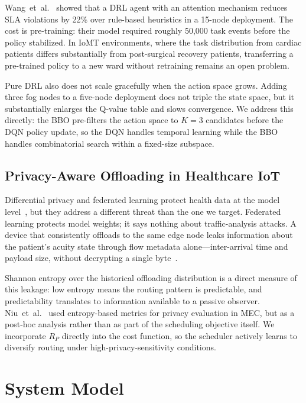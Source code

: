 \documentclass[journal]{IEEEtran}
\begin{document}
Wang~et~al.~\cite{wang2023attn} showed that a DRL agent with an
attention mechanism reduces SLA violations by 22\% over rule-based
heuristics in a 15-node deployment. The cost is pre-training: their
model required roughly 50{,}000 task events before the policy
stabilized. In IoMT environments, where the task distribution from
cardiac patients differs substantially from post-surgical recovery
patients, transferring a pre-trained policy to a new ward without
retraining remains an open problem.

Pure DRL also does not scale gracefully when the action space grows.
Adding three fog nodes to a five-node deployment does not triple the
state space, but it substantially enlarges the Q-value table and
slows convergence. We address this directly: the BBO pre-filters the
action space to $K = 3$ candidates before the DQN policy update,
so the DQN handles temporal learning while the BBO handles
combinatorial search within a fixed-size subspace.

\subsection{Privacy-Aware Offloading in Healthcare IoT}

Differential privacy and federated learning protect health data at the
model level~\cite{abadi2016dp}, but they address a different threat
than the one we target. Federated learning protects model weights; it
says nothing about traffic-analysis attacks. A device that consistently
offloads to the same edge node leaks information about the patient's
acuity state through flow metadata alone---inter-arrival time and
payload size, without decrypting a single byte~\cite{goldreich2001comp}.

Shannon entropy over the historical offloading distribution is a direct
measure of this leakage: low entropy means the routing pattern is
predictable, and predictability translates to information available to
a passive observer. Niu~et~al.~\cite{niu2023entropy} used
entropy-based metrics for privacy evaluation in MEC, but as a post-hoc
analysis rather than as part of the scheduling objective itself. We
incorporate $R_P$ directly into the cost function, so the scheduler
actively learns to diversify routing under high-privacy-sensitivity
conditions.

\section{System Model}
\label{sec:system_model}
\end{document}
